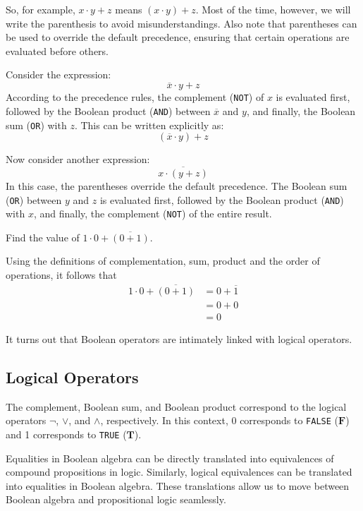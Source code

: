 So, for example, $x \cdot y+z$ means $(x \cdot y)+z$. Most of the time, however, we will write the parenthesis to avoid misunderstandings. Also note that parentheses can be used to override the default precedence, ensuring that certain operations are evaluated before others.

Consider the expression:
\[
\overline{x} \cdot y + z
\]
According to the precedence rules, the complement (\texttt{NOT}) of $x$ is evaluated first, followed by the Boolean product (\texttt{AND}) between $\overline{x}$ and $y$, and finally, the Boolean sum (\texttt{OR}) with $z$. This can be written explicitly as:
\[
(\overline{x} \cdot y) + z
\]

Now consider another expression:
\[
\overline{x \cdot (y + z)}
\]
In this case, the parentheses override the default precedence. The Boolean sum (\texttt{OR}) between $y$ and $z$ is evaluated first, followed by the Boolean product (\texttt{AND}) with $x$, and finally, the complement (\texttt{NOT}) of the entire result.

\begin{example}
    Find the value of $1 \cdot 0+\overline{(0+1)}$.

    \begin{solution}
        Using the definitions of complementation, sum, product and the order of operations, it follows that
        \[
        \begin{aligned}
        1 \cdot 0+\overline{(0+1)} & =0+\overline{1} \\
        & =0+0 \\
        & =0
        \end{aligned}
        \]
    \end{solution}
    \label{ex4.1}
\end{example}

It turns out that Boolean operators are intimately linked with logical operators.

\subsection*{Logical Operators}
The complement, Boolean sum, and Boolean product correspond to the logical operators $\neg$, $\vee$, and $\wedge$, respectively. In this context, 0 corresponds to \texttt{FALSE} ($\mathbf{F}$) and 1 corresponds to \texttt{TRUE} ($\mathbf{T}$). 

Equalities in Boolean algebra can be directly translated into equivalences of compound propositions in logic. Similarly, logical equivalences can be translated into equalities in Boolean algebra. These translations allow us to move between Boolean algebra and propositional logic seamlessly.


